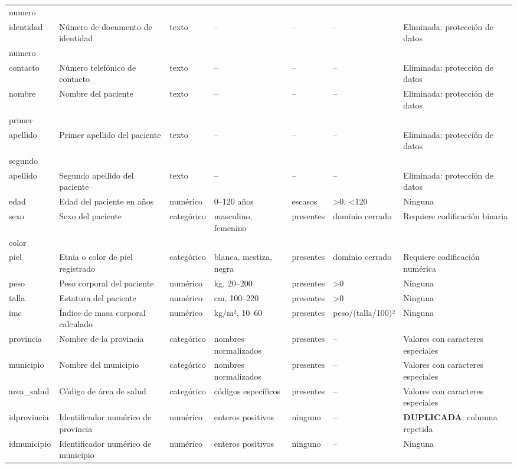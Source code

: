 \documentclass[11pt,a4paper]{article}
\begin{document}
\begin{longtable}{@{}L{0.095\textwidth} L{0.17\textwidth} L{0.07\textwidth} L{0.16\textwidth} L{0.14\textwidth} L{0.13\textwidth} L{0.15\textwidth}@{}}
numero\\identidad & Número de documento de identidad & texto & -- & -- & -- & Eliminada: protección de datos \\
numero\\contacto & Número telefónico de contacto & texto & -- & -- & -- & Eliminada: protección de datos \\
nombre & Nombre del paciente & texto & -- & -- & -- & Eliminada: protección de datos \\
primer\\apellido & Primer apellido del paciente & texto & -- & -- & -- & Eliminada: protección de datos \\
segundo\\apellido & Segundo apellido del paciente & texto & -- & -- & -- & Eliminada: protección de datos \\
edad & Edad del paciente en años & numérico & 0--120 años & escasos & >0, <120 & Ninguna \\
sexo & Sexo del paciente & categórico & masculino, femenino & presentes & dominio cerrado & Requiere codificación binaria \\
color\\piel & Etnia o color de piel registrado & categórico & blanca, mestiza, negra & presentes & dominio cerrado & Requiere codificación numérica \\
peso & Peso corporal del paciente & numérico & kg, 20--200 & presentes & >0 & Ninguna \\
talla & Estatura del paciente & numérico & cm, 100--220 & presentes & >0 & Ninguna \\
imc & Índice de masa corporal calculado & numérico & kg/m², 10--60 & presentes & peso/(talla/100)² & Ninguna \\
provincia & Nombre de la provincia & categórico & nombres normalizados & presentes & -- & Valores con caracteres especiales \\
municipio & Nombre del municipio & categórico & nombres normalizados & presentes & -- & Valores con caracteres especiales \\
area\_salud & Código de área de salud & categórico & códigos específicos & presentes & -- & Valores con caracteres especiales \\
idprovincia & Identificador numérico de provincia & numérico & enteros positivos & ninguno & -- & \textbf{DUPLICADA}: columna repetida \\
idmunicipio & Identificador numérico de municipio & numérico & enteros positivos & ninguno & -- & Ninguna \\

\end{longtable}
\end{document}
